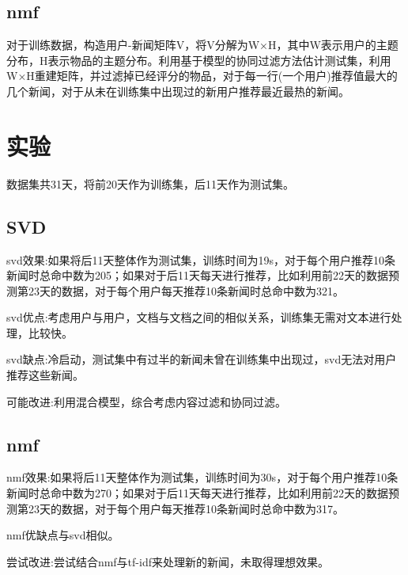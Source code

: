 \documentclass[UTF8]{article}
\begin{document}
\subsection{nmf}
对于训练数据，构造用户-新闻矩阵V，将V分解为W×H，其中W表示用户的主题分布，H表示物品的主题分布。利用基于模型的协同过滤方法估计测试集，利用W×H重建矩阵，并过滤掉已经评分的物品，对于每一行(一个用户)推荐值最大的几个新闻，对于从未在训练集中出现过的新用户推荐最近最热的新闻。
\section{实验}
数据集共31天，将前20天作为训练集，后11天作为测试集。
\subsection{SVD}

svd效果:如果将后11天整体作为测试集，训练时间为19s，对于每个用户推荐10条新闻时总命中数为205；如果对于后11天每天进行推荐，比如利用前22天的数据预测第23天的数据，对于每个用户每天推荐10条新闻时总命中数为321。

svd优点:考虑用户与用户，文档与文档之间的相似关系，训练集无需对文本进行处理，比较快。

svd缺点:冷启动，测试集中有过半的新闻未曾在训练集中出现过，svd无法对用户推荐这些新闻。

可能改进:利用混合模型，综合考虑内容过滤和协同过滤。
\subsection{nmf}
nmf效果:如果将后11天整体作为测试集，训练时间为30s，对于每个用户推荐10条新闻时总命中数为270；如果对于后11天每天进行推荐，比如利用前22天的数据预测第23天的数据，对于每个用户每天推荐10条新闻时总命中数为317。

nmf优缺点与svd相似。

尝试改进:尝试结合nmf与tf-idf来处理新的新闻，未取得理想效果。
\end{document}
